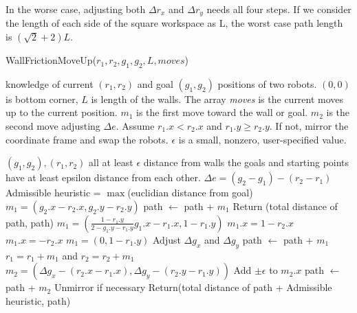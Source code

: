 In the worse case, adjusting both $\Delta r_x$ and $\Delta r_y$ needs all four steps. If we consider the length of each side of the square workspace as L, the worst case path length is $(\sqrt{2}+2)L$.





\begin{algorithm}
\caption{WallFrictionMoveUp($r_1,r_2,g_1,g_2,L, moves$)}\label{alg:Wallup}
\begin{algorithmic}[1]
\Require knowledge of current $(r_1,r_2)$ and goal $(g_1,g_2)$ positions of  two robots. 
$(0,0)$ is bottom corner,
 $L$ is length of the walls. 
 The array \emph{moves} is the current moves up to the current position.
 $m_1$ is the first move toward the wall or goal.
 $m_2$ is the second move adjusting $\Delta e$.
 Assume $r_1.x < r_2.x$ and $r_1.y \geq r_2.y$. If not, mirror the coordinate frame and swap the robots.
 $\epsilon $ is a small, nonzero, user-specified value.
 
\Ensure $(g_1, g_2) , (r_1, r_2)$ all at least $\epsilon$ distance from walls the goals and starting points have at least epsilon distance from each other.
\State $\Delta e = (g_2 - g_1)- (r_2- r_1)$
\State Admissible heuristic = $\max$(euclidian distance from goal)
\State $m_1 = (g_2.x -  r_2.x, g_2.y - r_2.y)$
\State path $\gets$ path + $m_1$
\State Return (total distance of path, path)
\EndIf
{} %
\State $m_1 = (\frac{1-r_1.y}{2-g_1.y-r_1.y} g_1.x -r_1.x, 1-r_1.y)$
\State $m_1.x = 1- r_2.x$
\EndIf
{}
\State $m_1.x = -r_2.x$
\EndIf
\Else 
\State $m_1 = (0, 1-r_1.y)$
\State Adjust $\Delta g_x$ and $\Delta g_y$ %
\EndIf
\State path $\gets$ path + $m_1$
\State $r_1 = r_1 + m_1$ and $r_2 = r_2 + m_1$
\State $m_2 = (\Delta g_x - (r_2.x- r_1.x), \Delta g_y - (r_2.y-r_1.y))$
\State Add $\pm \epsilon$ to $m_2.x$
\EndIf
\State path $\gets$ path + $m_2$
\State Unmirror if necessary
\State Return(total distance of path + Admissible heuristic, path)
\end{algorithmic}
\end{algorithm}



